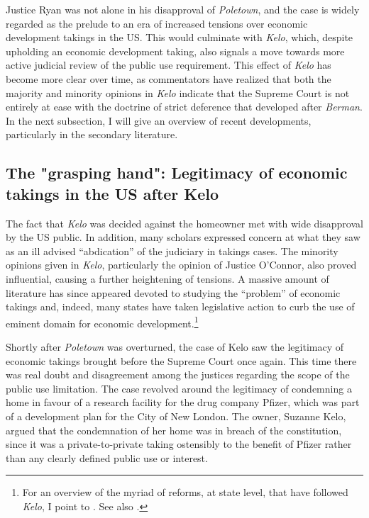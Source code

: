 Justice Ryan was not alone in his disapproval of {\it Poletown}, and the case is widely regarded as the prelude to an era of increased tensions over economic development takings in the US. This would culminate with {\it Kelo}, which, despite upholding an economic development taking, also signals a move towards more active judicial review of the public use requirement. This effect of {\it Kelo} has become more clear over time, as commentators have realized that both the majority and minority opinions in {\it Kelo} indicate that the Supreme Court is not entirely at ease with the doctrine of strict deference that developed after {\it Berman}. In the next subsection, I will give an overview of recent developments, particularly in the secondary literature.

\subsection{The "grasping hand": Legitimacy of economic takings in the US after Kelo}

The fact that {\it Kelo} was decided against the homeowner met with wide disapproval by the US public. In addition, many scholars expressed concern at what they saw as an ill advised ``abdication'' of the judiciary in takings cases. The minority opinions given in {\it Kelo}, particularly the opinion of Justice O'Connor, also proved influential, causing a further heightening of tensions. A massive amount of literature has since appeared devoted to studying the ``problem'' of economic takings and, indeed, many states have taken legislative action to curb the use of eminent domain for economic development.\footnote{For an overview of the myriad of reforms, at state level, that have followed {\it Kelo}, I point to \cite{eagle08}. See also \cite{somin009}.}

Shortly after {\it Poletown} was overturned, the case of Kelo saw the legitimacy of economic takings brought before the Supreme Court once again. This time there was real doubt and disagreement among the justices regarding the scope of the public use limitation. The case revolved around the legitimacy of condemning a home in favour of a research facility for the drug company Pfizer, which was part of a development plan for the City of New London.  The owner, Suzanne Kelo, argued that the condemnation of her home was in breach of the constitution, since it was a private-to-private taking ostensibly to the benefit of Pfizer rather than any clearly defined public use or interest.

